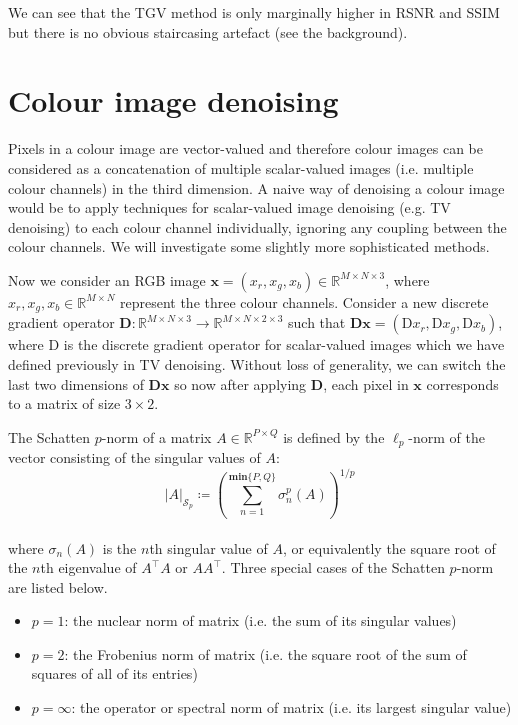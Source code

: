 \documentclass{article}
\begin{document}
We can see that the TGV method is only marginally higher in RSNR and SSIM but there is no obvious staircasing artefact (see the background).

\section*{Colour image denoising} \label{sec:colour_denoising}
Pixels in a colour image are vector-valued and therefore colour images can be considered as a concatenation of multiple scalar-valued images (i.e. multiple colour channels) in the third dimension. A naive way of denoising a colour image would be to apply techniques for scalar-valued image denoising (e.g. TV denoising) to each colour channel individually, ignoring any coupling between the colour channels. We will investigate some slightly more sophisticated methods.

Now we consider an RGB image \(\mathbf{x}=\left(x_r,x_g,x_b\right) \in \mathbb{R}^{M \times N \times 3}\), where \(x_r,x_g,x_b \in \mathbb{R}^{M \times N}\) represent the three colour channels. Consider a new discrete gradient operator \(\mathbf{D}: \mathbb{R}^{M \times N \times 3} \rightarrow \mathbb{R}^{M \times N \times 2 \times 3}\) such that \(\mathbf{D}\mathbf{x} = \left(\mathrm{D}x_r,\mathrm{D}x_g,\mathrm{D}x_b\right)\), where \(\mathrm{D}\) is the discrete gradient operator for scalar-valued images which we have defined previously in TV denoising. Without loss of generality, we can switch the last two dimensions of \(\mathbf{D}\mathbf{x}\) so now after applying \(\mathbf{D}\), each pixel in \(\mathbf{x}\) corresponds to a matrix of size \(3 \times 2\).

The Schatten \(p\)-norm of a matrix \(A \in \mathbb{R}^{P \times Q}\) is defined by the \(\ell_p\)-norm of the vector consisting of the singular values of \(A\):\\
%
\[\left|A\right|_{\mathcal{S}_p} \coloneqq \left( \sum^{\textbf{min}\{P,Q\}}_{n=1} \sigma_{n}^{p}\left(A\right) \right)^{1/p} \]\\
%
where \(\sigma_{n} \left(A\right)\) is the \(n\)th singular value of \(A\), or equivalently the square root of the \(n\)th eigenvalue of \(A^\top A\) or \(A A^\top\). Three special cases of the Schatten \(p\)-norm are listed below.
\begin{itemize}
    \item \(p=1\): the nuclear norm of matrix (i.e. the sum of its singular values)
    \item \(p=2\): the Frobenius norm of matrix (i.e. the square root of the sum of squares of all of its entries)
    \item \(p=\infty\): the operator or spectral norm of matrix (i.e. its largest singular value)
\end{itemize}
\end{document}
